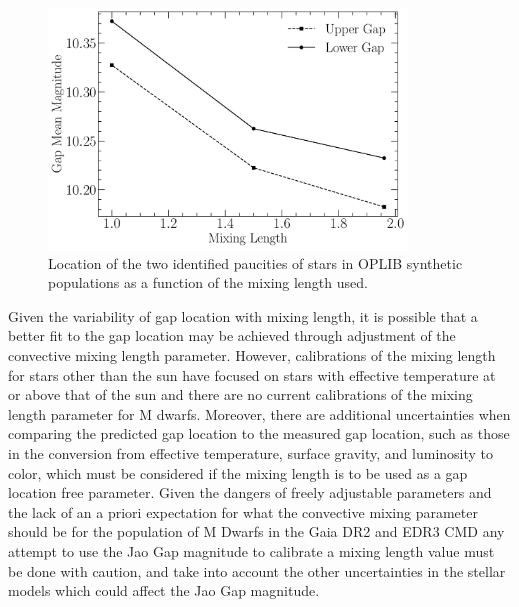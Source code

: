\begin{figure}
	\centering
	\includegraphics[width=0.85\textwidth]{figures/jaoOpacity/./MixingLengthScaling.pdf}
	\caption{Location of the two identified paucities of stars in OPLIB synthetic
	populations as a function of the mixing length used.}
	\label{fig:MixingLengthScaling}
\end{figure}

Given the variability of gap location with mixing length, it is possible that a
better fit to the gap location may be achieved through adjustment of the
convective mixing length parameter. However, calibrations of the mixing length
for stars other than the sun have focused on stars with effective temperature
at or above that of the sun and there are no current calibrations of the mixing
length parameter for M dwarfs. Moreover, there are additional uncertainties
when comparing the predicted gap location to the measured gap location, such as
those in the conversion from effective temperature, surface gravity, and
luminosity to color, which must be considered if the mixing length is to be
used as a gap location free parameter. Given the dangers of freely adjustable
parameters and the lack of an a priori expectation for what the convective
mixing parameter should be for the population of M Dwarfs in the Gaia DR2 and
EDR3 CMD any attempt to use the Jao Gap magnitude to calibrate a mixing length
value must be done with caution, and take into account the other uncertainties
in the stellar models which could affect the Jao Gap magnitude.

